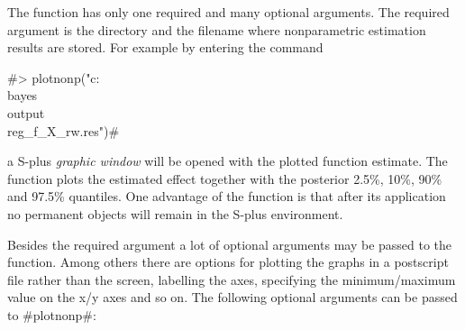 The function has only one required and many optional arguments.
The required argument is the directory and the filename where
nonparametric estimation results are stored. For example by
entering the command

#> plotnonp("c:\\bayes\\output\\reg_f_X_rw.res")#

a S-plus {\em graphic window} will be opened with the plotted
function estimate. The function plots the estimated effect
together with the posterior 2.5\%, 10\%, 90\% and 97.5\%
quantiles. One advantage of the function is that after its
application no permanent objects will remain in the S-plus
environment.

Besides the required argument a lot of optional arguments may be
passed to the function. Among others there are options for
plotting the graphs in a postscript file rather than the screen,
labelling the axes, specifying the minimum/maximum value on the
x/y axes and so on. The following optional arguments can be passed
to #plotnonp#:

